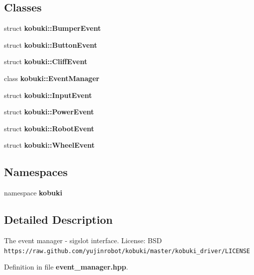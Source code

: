 \subsection*{\-Classes}
\begin{DoxyCompactItemize}
\item 
struct {\bf kobuki\-::\-Bumper\-Event}
\item 
struct {\bf kobuki\-::\-Button\-Event}
\item 
struct {\bf kobuki\-::\-Cliff\-Event}
\item 
class {\bf kobuki\-::\-Event\-Manager}
\item 
struct {\bf kobuki\-::\-Input\-Event}
\item 
struct {\bf kobuki\-::\-Power\-Event}
\item 
struct {\bf kobuki\-::\-Robot\-Event}
\item 
struct {\bf kobuki\-::\-Wheel\-Event}
\end{DoxyCompactItemize}
\subsection*{\-Namespaces}
\begin{DoxyCompactItemize}
\item 
namespace {\bf kobuki}
\end{DoxyCompactItemize}


\subsection{\-Detailed \-Description}
\-The event manager -\/ sigslot interface. \-License\-: \-B\-S\-D {\tt https\-://raw.\-github.\-com/yujinrobot/kobuki/master/kobuki\-\_\-driver/\-L\-I\-C\-E\-N\-S\-E} 

\-Definition in file {\bf event\-\_\-manager.\-hpp}.


